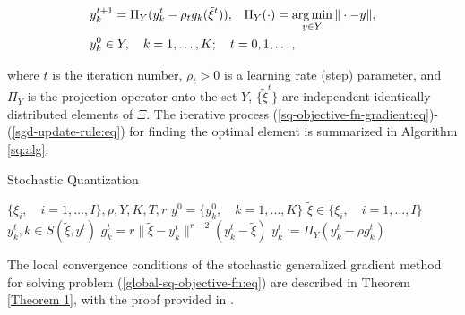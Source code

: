 \begin{eqnarray}
    \label{sgd-update-rule:eq}
    \begin{aligned}
        & y^{t+1}_k = \Pi_{Y} (y^t_k - \rho_t g_k(\tilde{\xi}^t)), \;\;\; \Pi_{Y} (\cdot) = \operatorname*{arg\,min}_{y \in Y} \| \cdot - y\|, \\
        & y^0_k \in Y, \quad k=1,\ldots,K;\quad t=0,1,\ldots, \label{sgd-update-rule2:eq}
    \end{aligned}
\end{eqnarray}

\noindent where $t$ is the iteration number, $\rho_t > 0$ is a learning rate (step) parameter, and $\Pi_{Y}$ is the projection operator onto the set $Y$, $\{\tilde{\xi}^t\}$ are independent identically distributed elements of $\Xi$. The iterative process (\ref{sq-objective-fn-gradient:eq})-(\ref{sgd-update-rule:eq}) for finding the optimal element is summarized in Algorithm \ref{sq:alg}.

\begin{algorithm}
    \caption{Stochastic Quantization}\label{sq:alg}
    \begin{algorithmic}[1]
        \Require $\{ \xi_i, \quad i = 1, \ldots, I \}, \rho, Y, K, T, r$
        \State $y^0 = \{ y_k^0, \quad k = 1, \ldots, K \}$ 
            \State $\tilde{\xi} \in \{ \xi_i, \quad i = 1, \ldots, I \}$ 
            \State $y_k^t, k \in S(\tilde{\xi}, y^t)$ 
            \State $g_k^t = r \| \tilde{\xi} - y_k^t \|^{r - 2} (y_k^t - \tilde{\xi})$ 
            \State $y_k^t := \Pi_Y (y_k^t - \rho g_k^t)$ 
        \EndFor
    \end{algorithmic}
\end{algorithm}

The local convergence conditions of the stochastic generalized gradient method for solving problem (\ref{global-sq-objective-fn:eq}) are described in Theorem \ref{Theorem 1}, with the proof provided in \cite{Ermoliev_Norkin_2003,Ermolev_Norkin_1998}.

